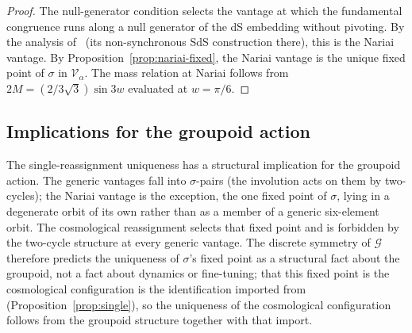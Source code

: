 \documentclass[11pt,a4paper]{article}
\theoremstyle{definition}
\begin{document}
\begin{proof}
The null-generator condition selects the vantage at which the fundamental congruence runs along a null generator of the dS embedding without pivoting. By the analysis of~\cite{JanzenCRframework} (its non-synchronous SdS construction there), this is the Nariai vantage. By Proposition~\ref{prop:nariai-fixed}, the Nariai vantage is the unique fixed point of $\sigma$ in $\mathcal{V}_{\alpha}$. The mass relation at Nariai follows from $2M=(2/3\sqrt{3})\sin 3w$ evaluated at $w=\pi/6$.
\end{proof}

\subsection{Implications for the groupoid action}\label{sec:single-implications}

The single-reassignment uniqueness has a structural implication for the groupoid action. The generic vantages fall into $\sigma$-pairs (the involution acts on them by two-cycles); the Nariai vantage is the exception, the one fixed point of $\sigma$, lying in a degenerate orbit of its own rather than as a member of a generic six-element orbit. The cosmological reassignment selects that fixed point and is forbidden by the two-cycle structure at every generic vantage. The discrete symmetry of $\mathcal{G}$ therefore predicts the uniqueness of $\sigma$'s fixed point as a structural fact about the groupoid, not a fact about dynamics or fine-tuning; that this fixed point is the cosmological configuration is the identification imported from~\cite{JanzenCRframework} (Proposition~\ref{prop:single}), so the uniqueness of the cosmological configuration follows from the groupoid structure together with that import.
\end{document}
